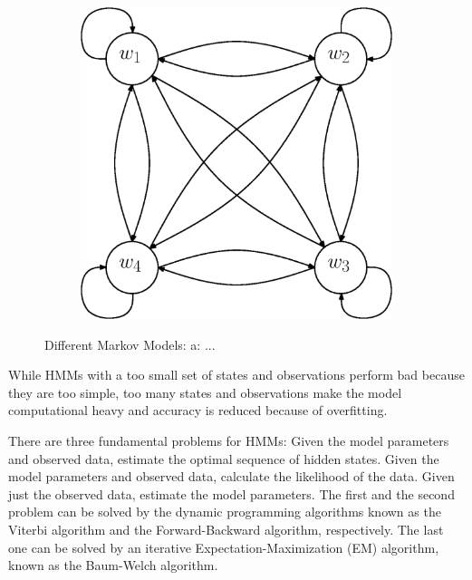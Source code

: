 \documentclass[a4paper, oneside]{csthesis}
\begin{document}
\begin{figure}
        \begin{subfigure}[b]{0.30\textwidth}
                \centering
                \includegraphics[width=\textwidth]{figures/hmm-ltr4.eps}
                \label{fig:hmm1}
        \end{subfigure}%



        \caption{Different Markov Models: a: ...}\label{fig:markov-models}
\end{figure}



While HMMs with a too small set of states and observations perform bad because they are too simple, too many states and observations make the model computational heavy and accuracy is reduced because of overfitting.

There are three fundamental problems for HMMs:
Given the model parameters and observed data, estimate the optimal sequence of hidden states.
Given the model parameters and observed data, calculate the likelihood of the data.
Given just the observed data, estimate the model parameters.
The first and the second problem can be solved by the dynamic programming algorithms known as the Viterbi algorithm and the Forward-Backward algorithm, respectively. The last one can be solved by an iterative Expectation-Maximization (EM) algorithm, known as the Baum-Welch algorithm.
\end{document}
